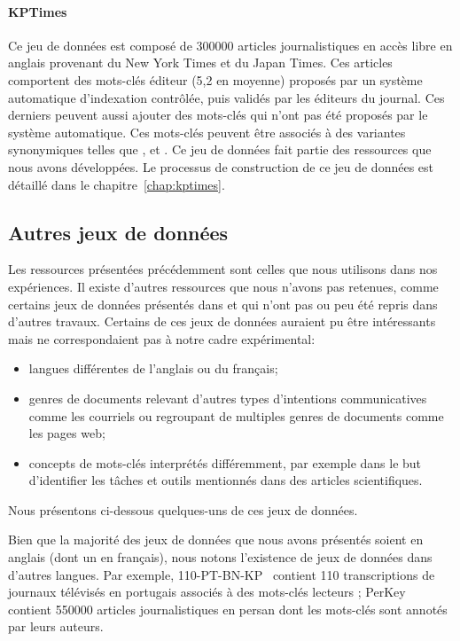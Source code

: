 \paragraph{KPTimes~\cite{gallina_kptimes_2019}}
Ce jeu de données est composé de \num{300 000} articles journalistiques en accès libre en anglais provenant du New York Times et du Japan Times.
Ces articles comportent des mots-clés éditeur (5,2 en moyenne) proposés par un système automatique d'indexation contrôlée, puis validés par les éditeurs du journal. Ces derniers peuvent aussi ajouter des mots-clés qui n'ont pas été proposés par le système automatique. Ces mots-clés peuvent être associés à des variantes synonymiques telles que ,  et .
Ce jeu de données fait partie des ressources que nous avons développées. Le processus de construction de ce jeu de données est détaillé dans le chapitre~\ref{chap:kptimes}.

\subsection{Autres jeux de données}\label{sub:framework_other}

Les ressources présentées précédemment sont celles que nous utilisons dans nos expériences. Il existe d'autres ressources que nous n'avons pas retenues, comme certains jeux de données présentés dans \citet{yuan_one_2020} et \citet{campos_yake_2020} qui n'ont pas ou peu été repris dans d'autres travaux. 
Certains de ces jeux de données auraient pu être intéressants mais ne correspondaient pas à notre cadre expérimental: 
\begin{itemize}
    \item langues différentes de l'anglais ou du français;
    \item genres de documents relevant d'autres types d'intentions communicatives comme les courriels ou regroupant de multiples genres de documents comme les pages web;
    \item concepts de mots-clés interprétés différemment, par exemple dans le but d'identifier les tâches et outils mentionnés dans des articles scientifiques.
\end{itemize}
Nous présentons ci-dessous quelques-uns de ces jeux de données.

Bien que la majorité des jeux de données que nous avons présentés soient en anglais (dont un en français), nous notons l'existence de jeux de données dans d'autres langues. Par exemple, 110-PT-BN-KP~\cite{marujo_keyphrase_2011} contient 110 transcriptions de journaux télévisés en portugais associés à des mots-clés lecteurs ;
PerKey~\cite{doostmohammadi_perkey_2018} contient \num{550 000} articles journalistiques en persan dont les mots-clés sont annotés par leurs auteurs.


